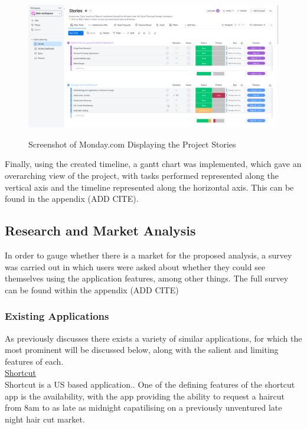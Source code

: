 \documentclass[12pt]{article}
\begin{document}
	\begin{figure}[H]
		\centering
		\includegraphics[scale=0.25]{images/monday.png}
		\caption{Screenshot of Monday.com Displaying the Project Stories}
		\label{fig:monday.com}
		\cite{monday.com}
	\end{figure}

	Finally, using the created timeline, a gantt chart was implemented, which gave an overarching view of the project, with tasks performed represented along the vertical axis and the timeline represented along the horizontal axis. This can be found in the appendix (ADD CITE).
	
	\subsection{Research and Market Analysis}
	In order to gauge whether there is a market for the proposed analysis, a survey was carried out in which users were asked about whether they could see themselves using the application features, among other things. The full survey can be found within the appendix (ADD CITE)
	
	\subsubsection{Existing Applications}
	As previously discusses there exists a variety of similar applications, for which the most prominent will be discussed below, along with the salient and limiting features of each.
	\\
	
	\noindent
	\underline{Shortcut}
	\\
	Shortcut is a US based application..
	One of the defining features of the shortcut app is the availability, with the app providing the ability to request a haircut from 8am to as late as midnight capatilising on a previously unventured late night hair cut market.
	
\end{document}
